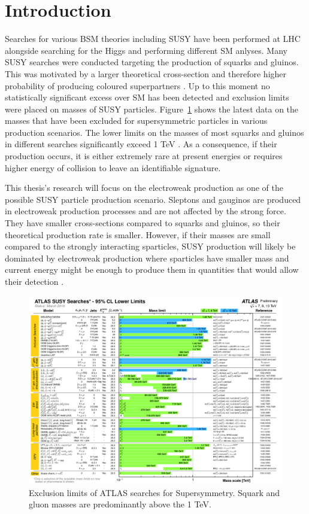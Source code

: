 \section{Introduction}

Searches for various BSM theories including SUSY have been performed at LHC  alongside searching for the Higgs and performing different SM anlyses. Many SUSY searches were conducted targeting the production of squarks and gluinos. This was motivated by a larger theoretical cross-section and therefore higher probability of producing coloured superpartners \cite{borschensky2014squark}. Up to this moment no statistically significant excess over SM has been detected and exclusion limits were placed on masses of SUSY particles. Figure~\ref{fig:SUSYlimit} shows the latest data on the masses that have been excluded for supersymmetric particles in various production scenarios. The lower limits on the masses of most squarks and gluinos in different searches significantly exceed 1 TeV \citep{aad2015summary}. As a consequence, if their production occurs, it is either extremely rare at present energies or requires higher energy of collision to leave an identifiable signature. 

This thesis's research will focus on the electroweak production as one of the possible SUSY particle production scenario. Sleptons and gauginos are produced in electroweak production processes and are not affected by the strong force. They have smaller cross-sections compared to squarks and gluinos, so their theoretical production rate is smaller. However, if their masses are small compared to the strongly interacting sparticles, SUSY production will likely be dominated by electroweak production where sparticles have smaller mass and current energy might be enough to produce them in quantities that would allow their detection \citep{atlas2015search}. 
\begin{figure}[!ht]
\includegraphics[width=\textwidth]{Chap3/ATLAS_SUSY_Summary.png}
\caption[Exclusion limits of ATLAS searches for Supersymmetry]{Exclusion limits of ATLAS searches for Supersymmetry. Squark and gluon masses are predominantly above the 1 TeV. \citep{SUSYlimits}}
\label{fig:SUSYlimit}
\end{figure}
\cleardoublepage


